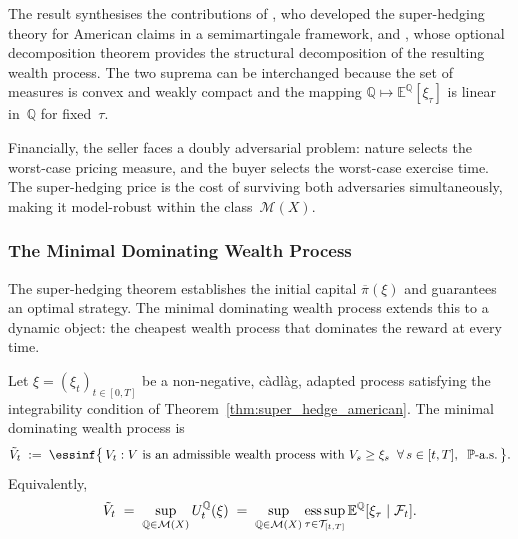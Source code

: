 The result synthesises the contributions of \citet{ElKarouiQuenez1995},
who developed the super-hedging theory for American claims in a
semimartingale framework, and \citet{Kramkov1996}, whose optional
decomposition theorem provides the structural decomposition of the
resulting wealth process.  The two suprema can be interchanged because
the set of measures is convex and weakly compact and the mapping
$\mathbb{Q} \mapsto \mathbb{E}^{\mathbb{Q}}[\xi_\tau]$ is linear
in~$\mathbb{Q}$ for fixed~$\tau$.

Financially, the seller faces a doubly adversarial problem: nature selects
the worst-case pricing measure, and the buyer selects the worst-case
exercise time.  The super-hedging price is the cost of surviving both
adversaries simultaneously, making it model-robust within the
class~$\mathcal{M}(X)$.


\subsubsection{The Minimal Dominating Wealth Process}
\label{sssec:minimal_dominating}

The super-hedging theorem establishes the initial capital
$\overline{\pi}(\xi)$ and guarantees an optimal strategy.  The minimal
dominating wealth process extends this to a dynamic object: the cheapest
wealth process that dominates the reward at every time.

\begin{definition}
\label{def:minimal_dominating}
Let $\xi = (\xi_t)_{t \in [0,T]}$ be a non-negative, c\`{a}dl\`{a}g,
adapted process satisfying the integrability condition of
Theorem~\ref{thm:super_hedge_american}.  The minimal dominating
wealth process is
\begin{equation}
\label{eq:tilde_V_def}
\tilde{V}_t
\;:=\;
\essinf\bigl\{\,V_t :
V \text{ is an admissible wealth process with }
V_s \ge \xi_s \;\;\forall\, s \in [t,T],\;\;
\mathbb{P}\text{-a.s.}\,\bigr\}.
\end{equation}
Equivalently,
\begin{equation}
\label{eq:tilde_V_dual}
\tilde{V}_t
\;=\;
\sup_{\mathbb{Q} \in \mathcal{M}(X)}
  U^{\mathbb{Q}}_t(\xi)
\;=\;
\sup_{\mathbb{Q} \in \mathcal{M}(X)}
\operatorname*{ess\,sup}_{\tau \in \mathcal{T}_{[t,T]}}
  \mathbb{E}^{\mathbb{Q}}[\xi_\tau \mid \mathcal{F}_t].
\end{equation}
\end{definition}

